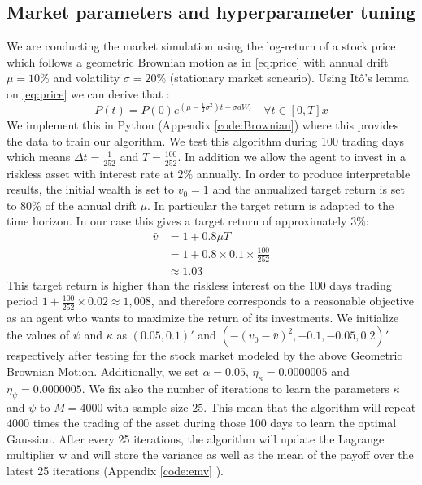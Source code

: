 \documentclass[oneside, a4paper, onecolumn, 11pt]{article}
\begin{document}
\subsection{Market parameters and hyperparameter tuning}
 We are conducting the market simulation using the log-return of a stock price which follows a geometric Brownian motion as in \eqref{eq:price} with annual drift $\mu = 10 \%$ and volatility $\sigma= 20\%$ (stationary market scneario). Using Itô's lemma on \eqref{eq:price} we can derive that :
\begin{equation}
    P(t) = P(0) e^{(\mu-\frac{1}{2}\sigma^2)t + \sigma dW_t} \quad \forall t \in [0,T]x
\end{equation}
We implement this in Python (Appendix \eqref{code:Brownian}) where this provides the data to train our algorithm. 
We test this algorithm during 100 trading days which means $\Delta t = \frac{1}{252}$ and $T = \frac{100}{252}$. In addition we allow the agent to invest in a riskless asset with interest rate at $2\%$ annually.
In order to produce interpretable results, the initial wealth is set to $v_0 = 1$ and the annualized target return is set to $80\%$ of the annual drift $\mu$. In particular the target return is adapted to the time horizon.
In our case this gives a target return of approximately $3\%$: 
\begin{align*}
    \bar{v} &= 1 + 0.8  \mu  T\\
            &= 1+ 0.8 \times 0.1 \times \frac{100}{252}\\
            &\approx 1.03
\end{align*}
This target return is higher than the riskless interest on the 100 days trading period $1+ \frac{100}{252}\times 0.02 \approx 1,008$, and therefore corresponds to a reasonable objective as an agent who wants to maximize the return of its investments.
We initialize the values of $\psi$ and $\kappa$ as $(0.05, 0.1)'$ and $\left(-(v_0-\bar{v})^2, -0.1, -0.05,0.2\right)'$ respectively after testing for the stock market modeled by the above Geometric Brownian Motion. Additionally, we set  $\alpha = 0.05$, $\eta_\kappa = 0.0000005$ and $\eta_\psi = 0.0000005$. We fix also the number of iterations to learn the parameters $\kappa$ and $\psi$ to $M = 4000$ with sample size $25$. This mean that the algorithm will repeat $4000$ times the trading of the asset during those 100 days to learn the optimal Gaussian. After every 25 iterations, the algorithm will update the Lagrange multiplier w and will store the variance as well as the  mean of the payoff over the latest 25 iterations (Appendix \eqref{code:emv} ).
\end{document}
